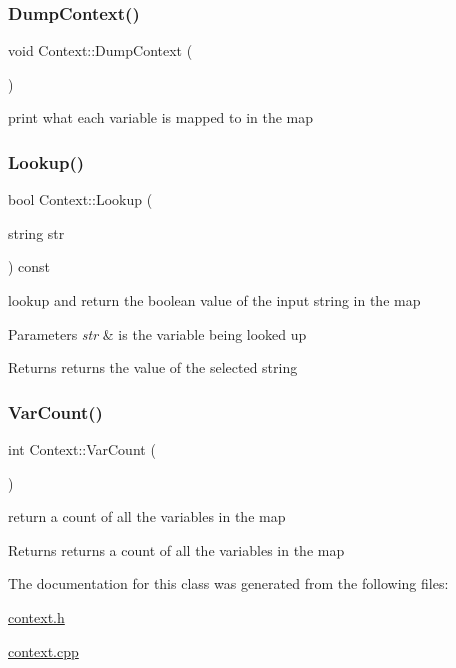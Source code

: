 \subsubsection{\texorpdfstring{Dump\+Context()}{DumpContext()}}
{\footnotesize\ttfamily void Context\+::\+Dump\+Context (\begin{DoxyParamCaption}{ }\end{DoxyParamCaption})}

print what each variable is mapped to in the map \mbox{\label{classContext_adb549e858c14fd20ea21d12df224034b}} 
\subsubsection{\texorpdfstring{Lookup()}{Lookup()}}
{\footnotesize\ttfamily bool Context\+::\+Lookup (\begin{DoxyParamCaption}\item[{string}]{str }\end{DoxyParamCaption}) const}

lookup and return the boolean value of the input string in the map 
\begin{DoxyParams}{Parameters}
{\em str} & is the variable being looked up \\
\hline
\end{DoxyParams}
\begin{DoxyReturn}{Returns}
returns the value of the selected string 
\end{DoxyReturn}
\mbox{\label{classContext_a548788d37239de4a5e8a85a128c9a570}} 
\subsubsection{\texorpdfstring{Var\+Count()}{VarCount()}}
{\footnotesize\ttfamily int Context\+::\+Var\+Count (\begin{DoxyParamCaption}{ }\end{DoxyParamCaption})}

return a count of all the variables in the map \begin{DoxyReturn}{Returns}
returns a count of all the variables in the map 
\end{DoxyReturn}


The documentation for this class was generated from the following files\+:\begin{DoxyCompactItemize}
\item 
\mbox{\hyperlink{context_8h}{context.\+h}}\item 
\mbox{\hyperlink{context_8cpp}{context.\+cpp}}\end{DoxyCompactItemize}
